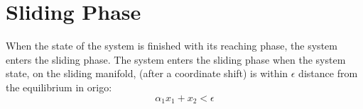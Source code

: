 \chapter{Sliding Phase}
When the state of the system is finished with its reaching phase, the system enters the sliding phase. The system enters the sliding phase when the system state, on the sliding manifold, (after a coordinate shift) is within $\epsilon$ distance from the equilibrium in origo:
\begin{equation}
  \alpha_1x_1 + x_2 < \epsilon
\end{equation}
